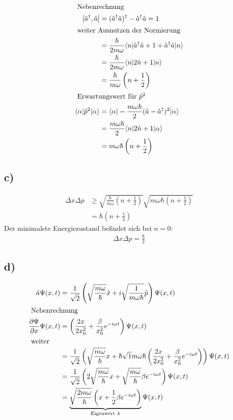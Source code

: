 \begin{align*}
        \intertext{
            Nebenrechnung
        }
        [\hat a ^\dagger , \hat a]&= (\hat a ^\dagger \hat a)^\dagger - \hat a ^\dagger \hat a =1\\
        \intertext{
            weiter Ausnutzen der Normierung
        }
        &=\frac{\hbar}{2m \omega} \langle n\rvert \hat a ^\dagger \hat a +1 + \hat a ^\dagger \hat a \lvert n\rangle\\
        &=\frac{\hbar}{2m \omega} \langle n\rvert 2 \hat n +1 \lvert n\rangle\\
        &=\frac{\hbar}{m \omega} \left(n+\frac{1}{2} \right)\\
        \intertext{
            Erwartungswert für $\hat p ^2$
        }
        \langle\alpha\rvert \hat p ^2 \lvert\alpha\rangle &= \langle\alpha\rvert \-- \frac{m \omega \hbar}{2} (\hat a - \hat a ^\dagger)^2 \lvert\alpha\rangle\\
        &= \frac{m \omega \hbar}{2} \langle n\rvert 2 \hat n +1 \lvert\alpha\rangle\\
        &=m \omega \hbar \left(n + \frac{1}{2} \right)
    \end{align*}

\subsection{c)}

\begin{align}
    \Delta x \Delta p &\geq \sqrt{\frac{\hbar}{m \omega}\left(n + \frac{1}{2} \right) } \sqrt{m \omega \hbar \left(n + \frac{1}{2} \right) }\\
    &= \hbar \left(n + \frac{1}{2} \right)
\end{align}
Der minimalste Energiezustand befindet sich bei $n=0$:
\begin{align}
    \Delta x \Delta p = \frac{\hbar}{2}
\end{align}


\subsection{d)}

\begin{align}
    \hat a \Psi (x,t) &= \frac{1}{\sqrt{2}} \left( \sqrt{\frac{ m \omega}{\hbar}} \hat x + i \sqrt{\frac{1}{m \omega \hbar}} \hat p \right) \Psi (x,t)\\
    \intertext{
        Nebenrechnung
    }
    \frac{\partial \Psi}{\partial x} \Psi (x,t) &= \left( \frac{2x}{2 x_0^2}+\frac{\beta}{x_0^2} e^{-i \omega t} \right) \Psi (x,t) \\
    \intertext{
        weiter
    }
    &=\frac{1}{\sqrt{2}} \left(\sqrt{\frac{m \omega}{\hbar}}x + \hbar \sqrt{1}{m \omega \hbar} \left( \frac{2x}{2 x_0^2}+\frac{\beta}{x_0^2} e^{-i \omega t} \right) \right) \Psi (x,t)\\
    &= \frac{1}{\sqrt{2}} \left(2 \sqrt{\frac{m \omega}{\hbar}}x + \sqrt{\frac{m \omega}{\hbar}} \beta e^{-i \omega t} \right) \Psi (x,t)\\
    &=\underbrace{\sqrt{\frac{2 m \omega}{\hbar}} \left(x+\frac{1}{2} \beta e^{-i \omega t} \right)}_{\text{Eigenwert } \lambda} \Psi (x,t)
\end{align}


